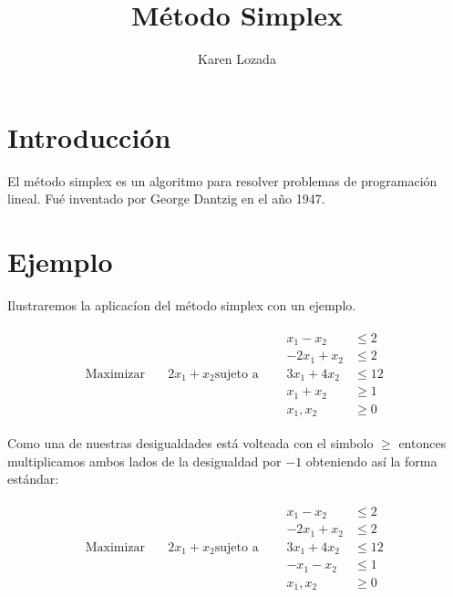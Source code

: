 \documentclass{article}
\title{Método Simplex}
\author{Karen Lozada}
\begin{document}
\maketitle

\section{Introducción}
\label{sec:introduccion}

El método simplex es un algoritmo para resolver problemas de programación lineal. Fué inventado por George Dantzig en el año 1947.

\section{Ejemplo}
\label{sec:ejemplo}

Ilustraremos la aplicacíon del método simplex con un ejemplo.

\begin{equation*}
  \begin{aligned}
    \text{Maximizar} \quad & 2x_1 +x_2
    
    \text{sujeto a} \quad &
    \begin      {aligned}
      x_1-x_2 &\leq 2\\
      -2x_1+x_2 &\leq 2\\
      3x_1+4x_2 &\leq 12\\
      x_1+x_2 &\geq 1\\
      x_1,x_2 &\geq 0
    \end{aligned}
  \end{aligned}
\end{equation*}

Como una de nuestras desigualdades está volteada con el simbolo $\geq$ entonces multiplicamos ambos lados de la desigualdad por $-1$ obteniendo así la forma estándar:

\begin{equation*}
  \begin{aligned}
    \text{Maximizar} \quad & 2x_1 +x_2
    
    \text{sujeto a} \quad &
    \begin      {aligned}
      x_1-x_2 &\leq 2\\
      -2x_1+x_2 &\leq 2\\
      3x_1+4x_2 &\leq 12\\
     -x_1-x_2 &\leq 1\\
      x_1,x_2 &\geq 0
    \end{aligned}
  \end{aligned}
\end{equation*}
\end{document}
